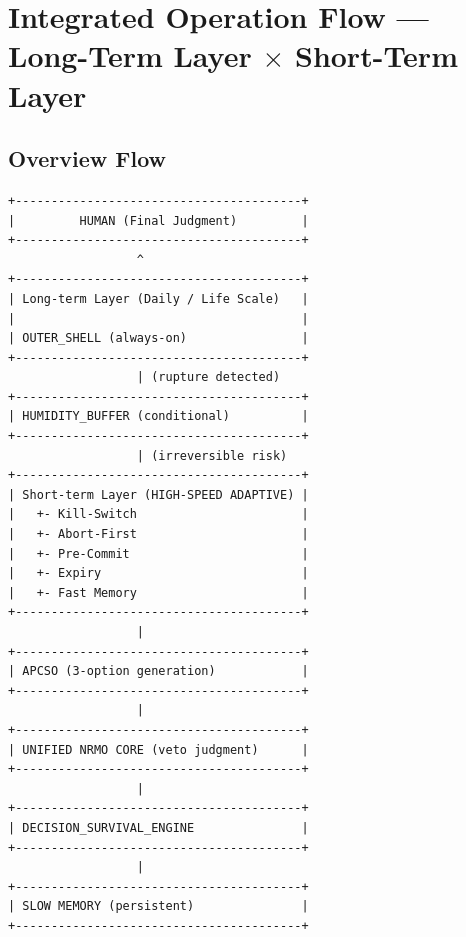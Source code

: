 
\chapter{Integrated Operation Flow ---
Long-Term Layer $\times$ Short-Term Layer}
\label{ch:integrated-flow}


\section{Overview Flow}
\label{sec:integrated-flow-overview}

\begin{lstlisting}[basicstyle=\ttfamily\scriptsize,frame=single]
+----------------------------------------+
|         HUMAN (Final Judgment)         |
+----------------------------------------+
                  ^
+----------------------------------------+
| Long-term Layer (Daily / Life Scale)   |
|                                        |
| OUTER_SHELL (always-on)                |
+----------------------------------------+
                  | (rupture detected)
+----------------------------------------+
| HUMIDITY_BUFFER (conditional)          |
+----------------------------------------+
                  | (irreversible risk)
+----------------------------------------+
| Short-term Layer (HIGH-SPEED ADAPTIVE) |
|   +- Kill-Switch                       |
|   +- Abort-First                       |
|   +- Pre-Commit                        |
|   +- Expiry                            |
|   +- Fast Memory                       |
+----------------------------------------+
                  |
+----------------------------------------+
| APCSO (3-option generation)            |
+----------------------------------------+
                  |
+----------------------------------------+
| UNIFIED NRMO CORE (veto judgment)      |
+----------------------------------------+
                  |
+----------------------------------------+
| DECISION_SURVIVAL_ENGINE               |
+----------------------------------------+
                  |
+----------------------------------------+
| SLOW MEMORY (persistent)               |
+----------------------------------------+
\end{lstlisting}

